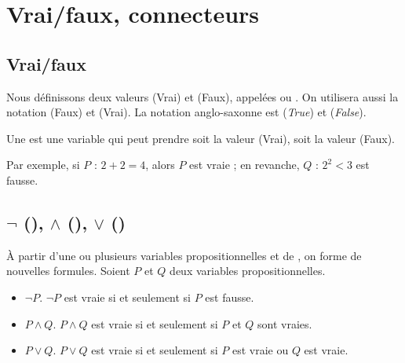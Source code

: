 \documentclass[11pt,class=report,crop=false]{standalone}
\begin{document}





\section{Vrai/faux, connecteurs}

\subsection{Vrai/faux}

Nous définissons deux valeurs \ltrue{} (Vrai) et \lfalse{} (Faux), appelées  ou .
On utilisera aussi la notation \lzero{} (Faux) et \lone{} (Vrai).
La notation anglo-saxonne est \ltruetrue{} (\emph{True}) et \lfalsefalse{} (\emph{False}).


Une  est une variable qui peut prendre soit la valeur \ltrue{} (Vrai), soit la valeur \lfalse{} (Faux).

Par exemple, si $P$ : \og{}$2+2 = 4$\fg{}, alors $P$ est vraie ; en revanche, $Q$ : \og{}$2^2 < 3$\fg{} est fausse.


\subsection{$\lnot$ (\tnot), $\land$ (\tand), $\lor$ (\tor)}

À partir d'une ou plusieurs variables propositionnelles et de , on forme de nouvelles formules.
Soient $P$ et $Q$ deux variables propositionnelles.

\begin{itemize}
	\item {} $\lnot P$. \quad $\lnot P$ est vraie si et seulement si $P$ est fausse.
    
	\item {} $P \land Q$. \quad  $P \land Q$ est vraie si et seulement si $P$ et $Q$ sont vraies.
    
	\item {} $P \lor Q$. \quad $P \lor Q$ est vraie si et seulement si $P$ est vraie ou $Q$ est vraie.
\end{itemize}
\end{document}
